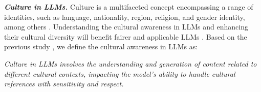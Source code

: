 





\textit{\textbf{Culture in LLMs.}} Culture is a multifaceted concept encompassing a range of identities, such as language, nationality, region, religion, and gender identity, among others \cite{li2024culturellm, adilazuarda2024towards, li2024culturepark, tao2024cultural}. Understanding the cultural awareness in LLMs and enhancing their cultural diversity will benefit fairer and applicable LLMs \cite{adilazuarda2024towards}. Based on the previous study \cite{li2024culturellm, adilazuarda2024towards, li2024culturepark, li2024how}, we define the cultural awareness in LLMs as:

\begin{tcolorbox}[definition]
\textit{Culture in LLMs involves the understanding and generation of content related to different cultural contexts, impacting the model's ability to handle cultural references with sensitivity and respect.}
\end{tcolorbox}

